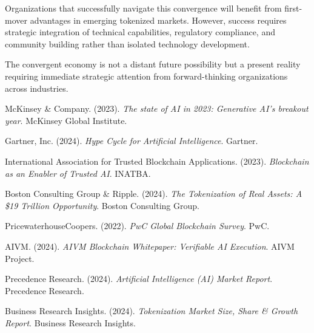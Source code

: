 \documentclass[11pt]{article}
\begin{document}
Organizations that successfully navigate this convergence will benefit from first-mover advantages in emerging tokenized markets. However, success requires strategic integration of technical capabilities, regulatory compliance, and community building rather than isolated technology development.

The convergent economy is not a distant future possibility but a present reality requiring immediate strategic attention from forward-thinking organizations across industries.

\begin{thebibliography}{9}

McKinsey \& Company. (2023). \textit{The state of AI in 2023: Generative AI's breakout year}. McKinsey Global Institute.

Gartner, Inc. (2024). \textit{Hype Cycle for Artificial Intelligence}. Gartner.

International Association for Trusted Blockchain Applications. (2023). \textit{Blockchain as an Enabler of Trusted AI}. INATBA.

Boston Consulting Group \& Ripple. (2024). \textit{The Tokenization of Real Assets: A \$19 Trillion Opportunity}. Boston Consulting Group.

PricewaterhouseCoopers. (2022). \textit{PwC Global Blockchain Survey}. PwC.

AIVM. (2024). \textit{AIVM Blockchain Whitepaper: Verifiable AI Execution}. AIVM Project.

Precedence Research. (2024). \textit{Artificial Intelligence (AI) Market Report}. Precedence Research.

Business Research Insights. (2024). \textit{Tokenization Market Size, Share \& Growth Report}. Business Research Insights.

\end{thebibliography}
\end{document}
